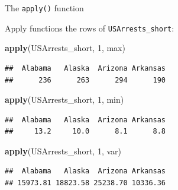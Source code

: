 \documentclass[ignorenonframetext,]{beamer}
\newenvironment{Shaded}{\begin{snugshade}}{\end{snugshade}}
\newcommand{\DecValTok}[1]{\textcolor[rgb]{0.00,0.00,0.81}{#1}}
\newcommand{\KeywordTok}[1]{\textcolor[rgb]{0.13,0.29,0.53}{\textbf{#1}}}
\newcommand{\NormalTok}[1]{#1}
\begin{document}
\begin{frame}[fragile]{The \texttt{apply()} function}
\protect\hypertarget{the-apply-function-2}{}

Apply functions the rows of \texttt{USArrests\_short}:

\begin{Shaded}
\begin{Highlighting}[]
\KeywordTok{apply}\NormalTok{(USArrests_short, }\DecValTok{1}\NormalTok{, max)}
\end{Highlighting}
\end{Shaded}

\begin{verbatim}
##  Alabama   Alaska  Arizona Arkansas 
##      236      263      294      190
\end{verbatim}

\begin{Shaded}
\begin{Highlighting}[]
\KeywordTok{apply}\NormalTok{(USArrests_short, }\DecValTok{1}\NormalTok{, min)}
\end{Highlighting}
\end{Shaded}

\begin{verbatim}
##  Alabama   Alaska  Arizona Arkansas 
##     13.2     10.0      8.1      8.8
\end{verbatim}

\begin{Shaded}
\begin{Highlighting}[]
\KeywordTok{apply}\NormalTok{(USArrests_short, }\DecValTok{1}\NormalTok{, var)}
\end{Highlighting}
\end{Shaded}

\begin{verbatim}
##  Alabama   Alaska  Arizona Arkansas 
## 15973.81 18823.58 25238.70 10336.36
\end{verbatim}

\end{frame}
\end{document}
